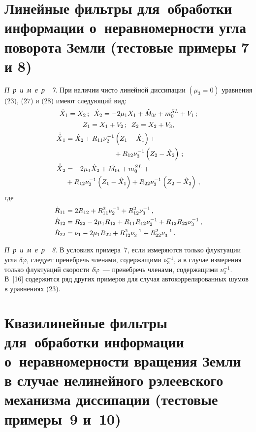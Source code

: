 \begin{multicols}{2}
\section{Линейные фильтры для~обработки информации о~неравномерности угла
поворота Земли (тестовые примеры 7 и 8)}  %

 \textit{ П\ р\ и\ м\ е\ р~~7\/}. При наличии чисто линейной диссипации
 $(\mu_3 =0)$ уравнения (23), (27) и (28) имеют следующий вид:
$$
 \dot X_1 = X_2\,;\enskip \dot X_2 =- 2 \mu_1 X_1 +\tilde M_{0t} + m_0^{SL} + V_1\,;$$ %
$$ Z_1= X_1+ V_2\,;\enskip Z_2 = X_2 + V_3, %
$$
 \begin{align*}
{\dot{\hat X}}_1 &=\hat X_2 + R_{11} \nu_2^{-1} \left(Z_1-\hat X_1\right) +{}\\
& \hspace*{70pt}{}+ R_{12} \nu_3^{-1} \left(Z_2 -\hat X_2\right)\,;\notag\\
 {\dot{\hat X}}_2 &=-2\mu_1\hat X_2 +\tilde M_{0t} + m_0^{SL} +{}\\
&{}+R_{12} \nu_2^{-1} \left(Z_1 -\hat X_1\right) + R_{22} \nu_3^{-1} \left(Z_2 -\hat X_2\right)\,, %
\end{align*}
где
\begin{align*}
 \dot R_{11} &= 2 R_{12} + R_{11}^2 \nu_2^{-1} + R_{12}^2 \nu_3^{-1}\,,\notag\\
 \dot R_{12} &= R_{22} - 2 \mu_1 R_{12} + R_{11} R_{12} \nu_2^{-1} + R_{12} R_{22} \nu_3^{-1}\,,\notag\\
 \dot R_{22} &= \nu_1 - 2 \mu_1 R_{22} + R_{12}^2 \nu_2^{-1} + R_{22}^2 \nu_3^{-1}\,. %
 \end{align*}

 \textit{ П\ р\ и\ м\ е\ р~~8\/}. В условиях примера~7, если измеряются
 только флуктуации угла $\delta \varphi$, следует пренебречь членами,
 содержащими $\nu_3^{-1}$, а в случае измерения только флуктуаций
 скорости $\delta \dot\varphi$~--- пренебречь членами, содержащими
 $\nu_2^{-1}$. В~[16] содержится ряд других примеров для случая
 автокоррелированных шумов в уравнениях (23).

\section{Квазилинейные фильтры для~обработки информации о~неравномерности
вращения Земли в случае нелинейного рэлеевского механизма диссипации
(тестовые примеры~9 и~10)} %


\end{multicols}
